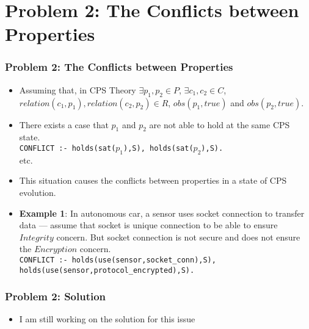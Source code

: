 \documentclass{beamer}
\begin{document}
\section{Problem 2: The Conflicts between Properties} 
\begin{frame}[fragile]
	\frametitle{Problem 2: The Conflicts between Properties}
	\begin{itemize}
		\item Assuming that, in CPS Theory $\exists p_1, p_2 \in P$, $\exists c_1, c_2 \in C$, $relation(c_1,p_1), relation(c_2,p_2) \in R$, $obs(p_1,true)$ and $obs(p_2,true)$.
		\item There exists a case that $p_1$ and $p_2$ are not able to hold at the same CPS state. \\
		{\tt CONFLICT :- holds(sat($p_1$),S), holds(sat($p_2$),S).} \\
		etc.
		\item This situation causes the conflicts between properties in a state of CPS evolution.
		\item {\bf Example 1}: In autonomous car, a sensor uses socket connection to transfer data --- assume that socket is unique connection to be able to ensure $Integrity$ concern. But socket connection is not secure and does not ensure the $Encryption$ concern. \\
		{\tt CONFLICT :- holds(use(sensor,socket\_conn),S), holds(use(sensor,protocol\_encrypted),S).}   	
	\end{itemize}
\end{frame}

\begin{frame}[fragile]
	\frametitle{Problem 2: Solution }
	\begin{itemize}
		\item I am still working on the solution for this issue 	   
	\end{itemize}
\end{frame}

\end{document}
